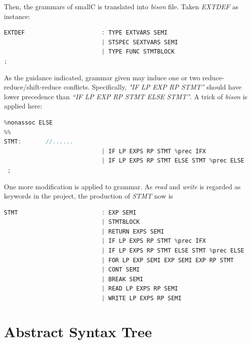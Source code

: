 \documentclass{article}
\begin{document}
Then, the grammars of smallC is translated into \textit{bison} file. Taken \textit{EXTDEF} as instance:

\begin{lstlisting}[language = C] 
EXTDEF						: TYPE EXTVARS SEMI							{$$ = createNode(yylineno,extdefType, "extdef1", 2, createNode(yylineno,typeToken, $1, 0),$2); }
							| STSPEC SEXTVARS SEMI						{$$ = createNode(yylineno,extdefType, "extdef2", 2, $1,$2); }
							| TYPE FUNC STMTBLOCK						{$$ = createNode(yylineno,extdefType, "extdef func", 3, createNode(yylineno,typeToken, $1, 0),$2,$3); }
;
\end{lstlisting}

As the guidance indicated, grammar given may induce one or two reduce-reduce/shift-reduce conflicts. Specifically, \textit{"IF LP EXP RP STMT”} should have lower precedence than \textit{“IF LP EXP RP STMT
ELSE STMT”}. A trick of \textit{bison} is applied here:


\begin{lstlisting}[language = C] 
%nonassoc LOWER_THAN_ELSE
%nonassoc ELSE
%%
STMT:		//......
							| IF LP EXPS RP STMT %prec IFX				{$$ = createNode(yylineno,stmtType, "if stmt", 2, $3,$5); }
							| IF LP EXPS RP STMT ELSE STMT %prec ELSE	{$$ = createNode(yylineno,stmtType, "if stmt", 3, $3,$5,$7);}
 ;
\end{lstlisting}

One more modification is applied to grammar. As \textit{read} and \textit{write} is regarded as keywords in the project, the production of \textit{STMT} now is 
\begin{lstlisting}[language = C] 
STMT						: EXP SEMI									{$$ = ...; }
							| STMTBLOCK									{$$ = ...; }
							| RETURN EXPS SEMI							{$$ = ...; }
							| IF LP EXPS RP STMT %prec IFX				{$$ = ...; }
							| IF LP EXPS RP STMT ELSE STMT %prec ELSE	{$$ = ...;}
							| FOR LP EXP SEMI EXP SEMI EXP RP STMT		{$$ = ...; }
							| CONT SEMI									{$$ = ...; }
							| BREAK SEMI								{$$ = ...; }
							| READ LP EXPS RP SEMI						{$$ = ...;}
							| WRITE LP EXPS RP SEMI						{$$ = ...;}
\end{lstlisting}


\section{Abstract Syntax Tree}
\end{document}
